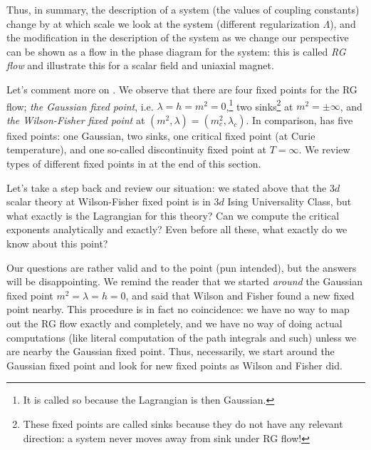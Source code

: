 \documentclass[12pt]{article}
\numberwithin{equation}{section}
\begin{document}
Thus, in summary, the description of a system (the values of coupling constants) change by at which scale we look at the system (different regularization $\Lambda$), and the modification in the description of the system as we change our perspective can be shown as a flow in the phase diagram for the system: this is called \emph{RG flow} and \figref{\ref{fig: Wilson-fisher}} illustrate this for a scalar field and uniaxial magnet.

Let's comment more on . We observe that there are four fixed points for the RG flow; \emph{the Gaussian fixed point}, i.e. $\lambda=h=m^2=0$,\footnote{It is called so because the Lagrangian is then Gaussian.} two sinks\footnote{These fixed points are called sinks because they do not have any relevant direction: a system never moves away from sink under RG flow!} at $m^2=\pm\infty$, and \emph{the Wilson-Fisher fixed point} at $(m^2,\lambda)=(m^2_c,\lambda_c)$. In comparison,  has five fixed points: one Gaussian, two sinks, one critical fixed point (at Curie temperature), and one so-called discontinuity fixed point at $T=\infty$. We review types of different fixed points in \tabref{\ref{table:classification of fixed points}} at the end of this section.

Let's take a step back and review our situation: we stated above that the $3d$ scalar theory at Wilson-Fisher fixed point is in $3d$ Ising Universality Class, but what exactly is the Lagrangian for this theory? Can we compute the critical exponents analytically and exactly? Even before all these, what exactly do we know about this point?

Our questions are rather valid and to the point (pun intended), but the answers will be disappointing. We remind the reader that we started \emph{around} the Gaussian fixed point $m^2=\lambda=h=0$, and said that Wilson and Fisher found a new fixed point nearby. This procedure is in fact no coincidence: we have no way to map out the RG flow exactly and completely, and we have no way of doing actual computations (like literal computation of the path integrals and such) unless we are nearby the Gaussian fixed point. Thus, necessarily, we start around the Gaussian fixed point and look for new fixed points as Wilson and Fisher did.
\end{document}
